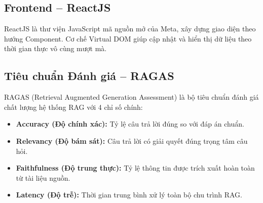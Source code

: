 \subsection{Frontend -- ReactJS}

ReactJS là thư viện JavaScript mã nguồn mở của Meta, xây dựng giao diện theo hướng Component. Cơ chế Virtual DOM giúp cập nhật và hiển thị dữ liệu theo thời gian thực vô cùng mượt mà.

\subsection{Tiêu chuẩn Đánh giá -- RAGAS}

RAGAS (Retrieval Augmented Generation Assessment) là bộ tiêu chuẩn đánh giá chất lượng hệ thống RAG với 4 chỉ số chính:
\begin{itemize}[itemsep=3pt]
  \item \textbf{Accuracy (Độ chính xác):} Tỷ lệ câu trả lời đúng so với đáp án chuẩn.
  \item \textbf{Relevancy (Độ bám sát):} Câu trả lời có giải quyết đúng trọng tâm câu hỏi.
  \item \textbf{Faithfulness (Độ trung thực):} Tỷ lệ thông tin được trích xuất hoàn toàn từ tài liệu nguồn.
  \item \textbf{Latency (Độ trễ):} Thời gian trung bình xử lý toàn bộ chu trình RAG.
\end{itemize}
